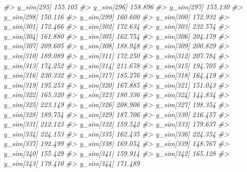 \documentclass[
  10pt,
  italian,
  a4paper,
  extrafontsizes,onecolumn,openright
  ]{memoir}
\newenvironment{Shaded}{\begin{snugshade}}{\end{snugshade}}
\newcommand{\CommentTok}[1]{\textcolor[rgb]{0.56,0.35,0.01}{\textit{#1}}}
\begin{document}
\begin{Shaded}
\begin{Highlighting}[]
\CommentTok{\#\textgreater{}   y\_sim[295] 155.105}
\CommentTok{\#\textgreater{}   y\_sim[296] 158.896}
\CommentTok{\#\textgreater{}   y\_sim[297] 155.130}
\CommentTok{\#\textgreater{}   y\_sim[298] 150.116}
\CommentTok{\#\textgreater{}   y\_sim[299] 160.600}
\CommentTok{\#\textgreater{}   y\_sim[300] 172.932}
\CommentTok{\#\textgreater{}   y\_sim[301] 172.466}
\CommentTok{\#\textgreater{}   y\_sim[302] 172.634}
\CommentTok{\#\textgreater{}   y\_sim[303] 232.574}
\CommentTok{\#\textgreater{}   y\_sim[304] 161.880}
\CommentTok{\#\textgreater{}   y\_sim[305] 162.754}
\CommentTok{\#\textgreater{}   y\_sim[306] 204.179}
\CommentTok{\#\textgreater{}   y\_sim[307] 209.605}
\CommentTok{\#\textgreater{}   y\_sim[308] 188.948}
\CommentTok{\#\textgreater{}   y\_sim[309] 200.829}
\CommentTok{\#\textgreater{}   y\_sim[310] 189.089}
\CommentTok{\#\textgreater{}   y\_sim[311] 172.250}
\CommentTok{\#\textgreater{}   y\_sim[312] 207.784}
\CommentTok{\#\textgreater{}   y\_sim[313] 174.252}
\CommentTok{\#\textgreater{}   y\_sim[314] 211.678}
\CommentTok{\#\textgreater{}   y\_sim[315] 194.705}
\CommentTok{\#\textgreater{}   y\_sim[316] 230.332}
\CommentTok{\#\textgreater{}   y\_sim[317] 185.276}
\CommentTok{\#\textgreater{}   y\_sim[318] 164.419}
\CommentTok{\#\textgreater{}   y\_sim[319] 195.253}
\CommentTok{\#\textgreater{}   y\_sim[320] 167.885}
\CommentTok{\#\textgreater{}   y\_sim[321] 151.043}
\CommentTok{\#\textgreater{}   y\_sim[322] 165.320}
\CommentTok{\#\textgreater{}   y\_sim[323] 180.336}
\CommentTok{\#\textgreater{}   y\_sim[324] 144.834}
\CommentTok{\#\textgreater{}   y\_sim[325] 223.149}
\CommentTok{\#\textgreater{}   y\_sim[326] 208.906}
\CommentTok{\#\textgreater{}   y\_sim[327] 198.354}
\CommentTok{\#\textgreater{}   y\_sim[328] 189.754}
\CommentTok{\#\textgreater{}   y\_sim[329] 187.706}
\CommentTok{\#\textgreater{}   y\_sim[330] 216.457}
\CommentTok{\#\textgreater{}   y\_sim[331] 212.123}
\CommentTok{\#\textgreater{}   y\_sim[332] 159.542}
\CommentTok{\#\textgreater{}   y\_sim[333] 179.637}
\CommentTok{\#\textgreater{}   y\_sim[334] 224.153}
\CommentTok{\#\textgreater{}   y\_sim[335] 162.435}
\CommentTok{\#\textgreater{}   y\_sim[336] 224.354}
\CommentTok{\#\textgreater{}   y\_sim[337] 192.499}
\CommentTok{\#\textgreater{}   y\_sim[338] 169.054}
\CommentTok{\#\textgreater{}   y\_sim[339] 148.767}
\CommentTok{\#\textgreater{}   y\_sim[340] 155.429}
\CommentTok{\#\textgreater{}   y\_sim[341] 159.914}
\CommentTok{\#\textgreater{}   y\_sim[342] 165.128}
\CommentTok{\#\textgreater{}   y\_sim[343] 179.410}
\CommentTok{\#\textgreater{}   y\_sim[344] 171.489}

\end{Highlighting}
\end{Shaded}
\end{document}
